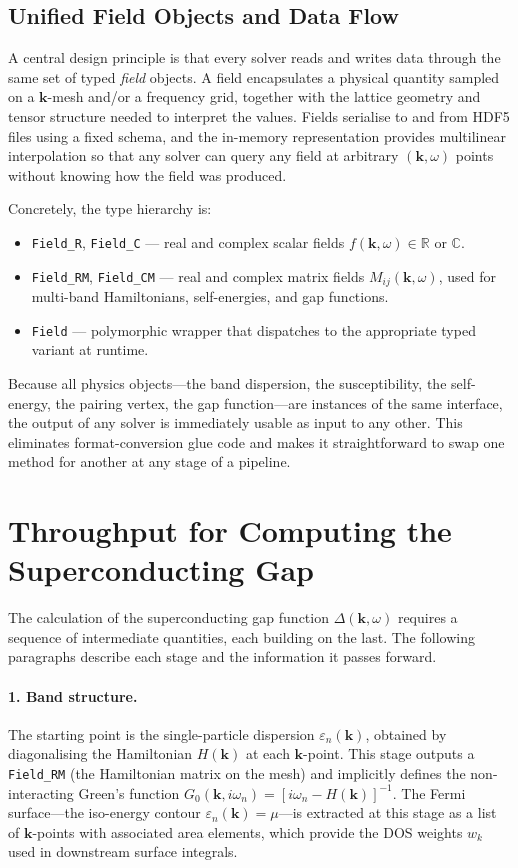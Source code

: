 \subsection{Unified Field Objects and Data Flow}

A central design principle is that every solver reads and writes data through the
same set of typed \emph{field} objects.  A field encapsulates a physical quantity
sampled on a $\mathbf{k}$-mesh and/or a frequency grid, together with the lattice
geometry and tensor structure needed to interpret the values.  Fields serialise to
and from HDF5 files using a fixed schema, and the in-memory representation provides
multilinear interpolation so that any solver can query any field at arbitrary
$(\mathbf{k},\omega)$ points without knowing how the field was produced.

Concretely, the type hierarchy is:
\begin{itemize}
    \item \texttt{Field\_R}, \texttt{Field\_C} --- real and complex scalar fields
        $f(\mathbf{k},\omega) \in \mathbb{R}$ or $\mathbb{C}$.
    \item \texttt{Field\_RM}, \texttt{Field\_CM} --- real and complex matrix fields
        $M_{ij}(\mathbf{k},\omega)$, used for multi-band Hamiltonians, self-energies,
        and gap functions.
    \item \texttt{Field} --- polymorphic wrapper that dispatches to the appropriate
        typed variant at runtime.
\end{itemize}
Because all physics objects---the band dispersion, the susceptibility, the
self-energy, the pairing vertex, the gap function---are instances of the same
interface, the output of any solver is immediately usable as input to any other.
This eliminates format-conversion glue code and makes it straightforward to swap
one method for another at any stage of a pipeline.

\section{Throughput for Computing the Superconducting Gap}
\label{sec:pipeline}

The calculation of the superconducting gap function $\Delta(\mathbf{k},\omega)$
requires a sequence of intermediate quantities, each building on the last.
The following paragraphs describe
each stage and the information it passes forward.

\paragraph{1. Band structure.}
The starting point is the single-particle dispersion $\varepsilon_n(\mathbf{k})$,
obtained by diagonalising the Hamiltonian $H(\mathbf{k})$ at each $\mathbf{k}$-point.
This stage outputs a \texttt{Field\_RM} (the Hamiltonian matrix on the mesh) and
implicitly defines the non-interacting Green's function
$G_0(\mathbf{k},i\omega_n) = [i\omega_n - H(\mathbf{k})]^{-1}$.
The Fermi surface---the iso-energy contour $\varepsilon_n(\mathbf{k})=\mu$---is
extracted at this stage as a list of $\mathbf{k}$-points with associated area
elements, which provide the DOS weights $w_k$ used in downstream surface integrals.

